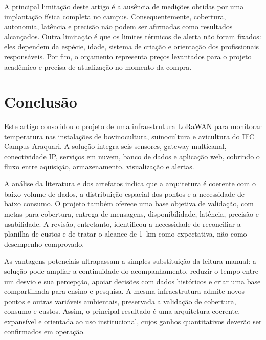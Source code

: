 \documentclass[10pt,a4paper,twocolumn]{article}
\begin{document}
A principal limitação deste artigo é a ausência de medições obtidas por uma
implantação física completa no campus. Consequentemente, cobertura, autonomia,
latência e precisão não podem ser afirmadas como resultados alcançados. Outra
limitação é que os limites térmicos de alerta não foram fixados: eles dependem da
espécie, idade, sistema de criação e orientação dos profissionais responsáveis.
Por fim, o orçamento representa preços levantados para o projeto acadêmico e
precisa de atualização no momento da compra.

\section{Conclusão}

Este artigo consolidou o projeto de uma infraestrutura LoRaWAN para monitorar
temperatura nas instalações de bovinocultura, suinocultura e avicultura do IFC
Campus Araquari. A solução integra seis sensores, gateway multicanal,
conectividade IP, serviços em nuvem, banco de dados e aplicação web, cobrindo o
fluxo entre aquisição, armazenamento, visualização e alertas.

A análise da literatura e dos artefatos indica que a arquitetura é coerente com
o baixo volume de dados, a distribuição espacial dos pontos e a necessidade de
baixo consumo. O projeto também oferece uma base objetiva de validação, com metas
para cobertura, entrega de mensagens, disponibilidade, latência, precisão e
usabilidade. A revisão, entretanto, identificou a necessidade de reconciliar a
planilha de custos e de tratar o alcance de \SI{1}{\kilo\meter} como expectativa,
não como desempenho comprovado.

As vantagens potenciais ultrapassam a simples substituição da leitura manual: a
solução pode ampliar a continuidade do acompanhamento, reduzir o tempo entre um
desvio e sua percepção, apoiar decisões com dados históricos e criar uma base
compartilhada para ensino e pesquisa. A mesma infraestrutura admite novos pontos
e outras variáveis ambientais, preservada a validação de cobertura, consumo e
custos. Assim, o principal resultado é uma arquitetura coerente, expansível e
orientada ao uso institucional, cujos ganhos quantitativos deverão ser
confirmados em operação.


\end{document}
